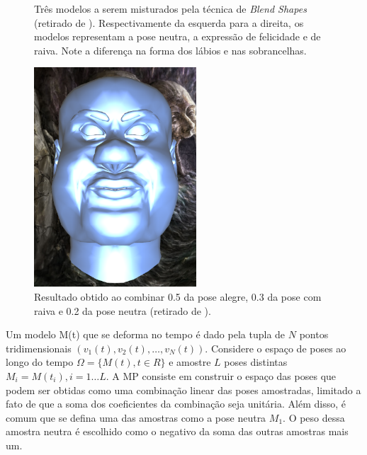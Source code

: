 {\begin{figure}[!htb]
\caption{Três modelos a serem misturados pela técnica de \textit{Blend Shapes} (retirado de \cite{tutorial-supremo-on-blend-shapes}). Respectivamente da esquerda para a direita, os modelos representam a pose neutra, a expressão de felicidade e de raiva. Note a diferença na forma dos lábios e nas sobrancelhas.}

\label{fig:blend-shapes-example-input} 
\end{figure}

\begin{figure}[!htb]
   \centering
  \includegraphics[width=0.6\linewidth]{./figs/outputOfBlendShapes.png}

\caption{Resultado obtido ao combinar 0.5 da pose alegre, 0.3 da pose com raiva e 0.2 da pose neutra (retirado de \cite{tutorial-supremo-on-blend-shapes}).}

\label{fig:blend-shapes-example-output} 
\end{figure}

    
    Um modelo M(t) que se deforma no tempo é dado pela tupla de $N$ pontos tridimensionais $ ( v_1(t), v_2(t), \ldots,  v_N(t))$. Considere o espaço de poses ao longo do tempo $\Omega = \{ M(t), t \in R\}$  e amostre $L$ poses distintas $M_i = M(t_i), i = 1 \ldots L$. A MP consiste em construir o espaço das poses que podem ser obtidas como uma combinação linear das poses amostradas, limitado a fato de que a soma dos coeficientes da combinação seja unitária. Além disso, é comum que se defina uma das amostras como a pose neutra $M_1$. O peso dessa amostra neutra é escolhido como o negativo da soma das outras amostras mais um.
    
}
